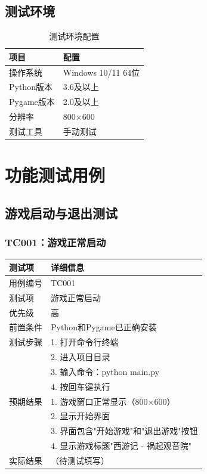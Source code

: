 \documentclass[a4paper,12pt]{article}
\begin{document}
\subsection{测试环境}
\begin{table}[h]
\centering
\caption{测试环境配置}
\begin{tabular}{ll}
\toprule
项目 & 配置 \\
\midrule
操作系统 & Windows 10/11 64位 \\
Python版本 & 3.6及以上 \\
Pygame版本 & 2.0及以上 \\
分辨率 & 800×600 \\
测试工具 & 手动测试 \\
\bottomrule
\end{tabular}
\end{table}

\section{功能测试用例}

\subsection{游戏启动与退出测试}

\subsubsection{TC001：游戏正常启动}
\begin{table}[h]
\centering
\begin{tabular}{ll}
\toprule
测试项 & 详细信息 \\
\midrule
用例编号 & TC001 \\
测试项 & 游戏正常启动 \\
优先级 & 高 \\
前置条件 & Python和Pygame已正确安装 \\
测试步骤 & 1. 打开命令行终端 \\
 & 2. 进入项目目录 \\
 & 3. 输入命令：python main.py \\
 & 4. 按回车键执行 \\
预期结果 & 1. 游戏窗口正常显示（800×600） \\
 & 2. 显示开始界面 \\
 & 3. 界面包含"开始游戏"和"退出游戏"按钮 \\
 & 4. 显示游戏标题"西游记 - 祸起观音院" \\
实际结果 & （待测试填写） \\
\bottomrule
\end{tabular}
\end{table}
\end{document}
